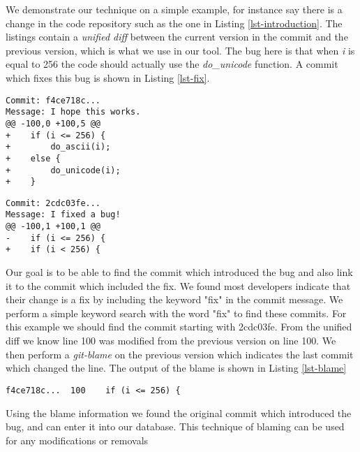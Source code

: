 
We demonstrate our technique on a simple example, for instance say
there is a change in the code repository such as the one in Listing
\ref{lst-introduction}. The listings contain a {\em unified diff}
between the current version in the commit and the previous version,
which is what we use in our tool. The bug here is that when {\em i} is
equal to 256 the code should actually use the {\em do\_unicode}
function. A commit which fixes this bug is shown in Listing \ref{lst-fix}.


\begin{lstlisting}[caption=An example bug introduction,label=lst-introduction, frame=single]
Commit: f4ce718c...
Message: I hope this works.
@@ -100,0 +100,5 @@
+    if (i <= 256) {
+        do_ascii(i);
+    else {
+        do_unicode(i);
+    }
\end{lstlisting}

\begin{lstlisting}[caption=An example bug fix,label=lst-fix,frame=single]
Commit: 2cdc03fe...
Message: I fixed a bug!
@@ -100,1 +100,1 @@
-    if (i <= 256) {
+    if (i < 256) {
\end{lstlisting}

Our goal is to be able to find the commit which introduced the bug and
also link it to the commit which included the fix. We found most
developers indicate that their change is a fix by including the keyword "fix"
in the commit message. We perform a simple keyword search with the word "fix"
to find these commits. For this example we should find the commit
starting with 2cdc03fe. From the unified diff we know line 100 was
modified from the previous version on line 100. We then perform a {\em
  git-blame} on the previous version which indicates the last commit
which changed the line. The output of the blame is shown in Listing
\ref{lst-blame}

\begin{lstlisting}[caption=Blame of the previous version,label=lst-blame,frame=single]
f4ce718c...  100    if (i <= 256) {
\end{lstlisting}

Using the blame information we found the original commit which
introduced the bug, and can enter it into our database. This
technique of blaming can be used for any modifications or removals

